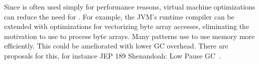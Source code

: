 Since \unsafe{} is often used simply for performance reasons, virtual machine
optimizations can reduce the need for \unsafe{}.
For example, 
the JVM's runtime compiler can be extended with optimizations for vectorizing
byte array accesses, eliminating the motivation to use \unsafe{} to process byte
arrays.
Many patterns use \unsafe{} to use memory more efficiently.
This could be ameliorated with lower GC overhead.
There are proposals for this, for instance JEP 189 Shenandoah:
Low Pause GC~\cite{jep189}.

